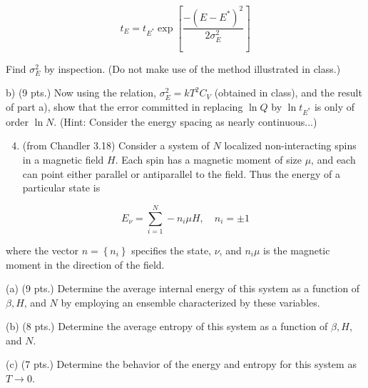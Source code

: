 \documentclass[10pt]{article}
\begin{document}
$$
t_{E}=t_{E^{*}} \exp \left[\frac{-\left(E-E^{*}\right)^{2}}{2 \sigma_{E}^{2}}\right]
$$

Find $\sigma_{E}^{2}$ by inspection. (Do not make use of the method illustrated in class.)

b) (9 pts.) Now using the relation, $\sigma_{E}^{2}=k T^{2} C_{V}$ (obtained in class), and the result of part a), show that the error committed in replacing $\ln Q$ by $\ln t_{E^{*}}$ is only of order $\ln N$. (Hint: Consider the energy spacing as nearly continuous...)

\begin{enumerate}
  \setcounter{enumi}{3}
  \item (from Chandler 3.18) Consider a system of $N$ localized non-interacting spins in a magnetic field $H$. Each spin has a magnetic moment of size $\mu$, and each can point either parallel or antiparallel to the field. Thus the energy of a particular state is
\end{enumerate}

$$
E_{\nu}=\sum_{i=1}^{N}-n_{i} \mu H, \quad n_{i}= \pm 1
$$

where the vector $n=\left\{n_{i}\right\}$ specifies the state, $\nu$, and $n_{i} \mu$ is the magnetic moment in the direction of the field.

(a) (9 pts.) Determine the average internal energy of this system as a function of $\beta, H$, and $N$ by employing an ensemble characterized by these variables.

(b) (8 pts.) Determine the average entropy of this system as a function of $\beta, H$, and $N$.

(c) (7 pts.) Determine the behavior of the energy and entropy for this system as $T \rightarrow 0$.
\end{document}
